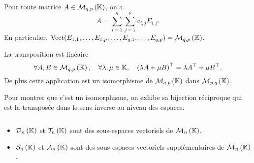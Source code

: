 \documentclass{magnolia}
\begin{document}
\begin{remarqueUnique}
\remarque Pour toute matrice $A\in\mathcal{M}_{q,p}\left(\mathbb{K}\right)$, on a
  \[A=\sum_{i=1}^q \sum_{j=1}^p a_{i,j}E_{i,j}.\]
  En particulier, $\operatorname{Vect}(E_{1,1},\ldots,E_{1,p},\ldots,E_{q,1},\ldots,E_{q,p})=\mathcal{M}_{q,p}\left(\mathbb{K}\right)$.
\end{remarqueUnique}



\begin{proposition}[utile=-3]
La transposition est linéaire
\[\forall A,B\in\mathcal{M}_{q,p}\left(\mathbb{K}\right) ,\quad \forall \lambda,\mu\in\mathbb{K} ,\quad
  {\left(\lambda A+\mu B\right)}^{\top}=\lambda{A}^{\top}+\mu{B}^{\top}.\]
De plus cette application est un isomorphisme de $\mathcal{M}_{q,p}\left(\mathbb{K}\right)$ dans
$\mathcal{M}_{p,q}\left(\mathbb{K}\right)$.
\end{proposition}

\begin{preuve}
Pour montrer que c'est un isomorphisme, on exhibe sa bijection réciproque qui est la transposée dans le sens inverse au niveau des espaces.
\end{preuve}

\begin{proposition}[utile=-3]
$\quad$
\begin{itemize}
\item $\mathcal{D}_n\left(\mathbb{K}\right)$ et $\mathcal{T}_n\left(\mathbb{K}\right)$ sont des sous-espaces
  vectoriels de $\mathcal{M}_{n}\left(\mathbb{K}\right)$.
\item $\mathcal{S}_n\left(\mathbb{K}\right)$ et $\mathcal{A}_n\left(\mathbb{K}\right)$ sont des sous-espaces
  vectoriels supplémentaires de $\mathcal{M}_{n}\left(\mathbb{K}\right)$.
\end{itemize}
\end{proposition}

\end{document}
